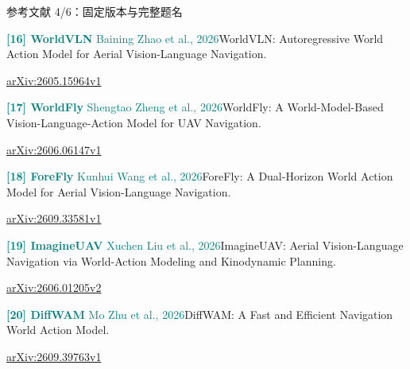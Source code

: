\documentclass[aspectratio=169,10pt]{beamer}
\def\slidesource{}
\begin{document}
\begin{frame}[t,label=refs4]{参考文献 4/6：固定版本与完整题名}
\relax
{\fontsize{8.3}{10.6}\selectfont
\par\textcolor{teal}{\textbf{[16] WorldVLN} Baining Zhao et al., 2026}\quad WorldVLN: Autoregressive World Action Model for Aerial Vision-Language Navigation.\par\href{https://arxiv.org/html/2605.15964v1}{arXiv:2605.15964v1}\par\vspace{1.8mm}
\par\textcolor{teal}{\textbf{[17] WorldFly} Shengtao Zheng et al., 2026}\quad WorldFly: A World-Model-Based Vision-Language-Action Model for UAV Navigation.\par\href{https://arxiv.org/html/2606.06147v1}{arXiv:2606.06147v1}\par\vspace{1.8mm}
\par\textcolor{teal}{\textbf{[18] ForeFly} Kunhui Wang et al., 2026}\quad ForeFly: A Dual-Horizon World Action Model for Aerial Vision-Language Navigation.\par\href{https://arxiv.org/html/2609.33581v1}{arXiv:2609.33581v1}\par\vspace{1.8mm}
\par\textcolor{teal}{\textbf{[19] ImagineUAV} Xuchen Liu et al., 2026}\quad ImagineUAV: Aerial Vision-Language Navigation via World-Action Modeling and Kinodynamic Planning.\par\href{https://arxiv.org/html/2606.01205v2}{arXiv:2606.01205v2}\par\vspace{1.8mm}
\par\textcolor{teal}{\textbf{[20] DiffWAM} Mo Zhu et al., 2026}\quad DiffWAM: A Fast and Efficient Navigation World Action Model.\par\href{https://arxiv.org/html/2609.39763v1}{arXiv:2609.39763v1}\par\vspace{1.8mm}
}
\end{frame}
\gdef\slidesource{\href{https://arxiv.org/html/2608.09467v3}{[21] RefineFly}；\href{https://arxiv.org/html/2606.02313v1}{[22] EG-GRPO}；\href{https://arxiv.org/html/2610.21450v1}{[23] X-Fly}；\href{https://arxiv.org/html/2610.25407v1}{[24] AeroDASH}；\href{https://arxiv.org/html/2603.12908v2}{[25] GoalSwarm}}
\end{document}

